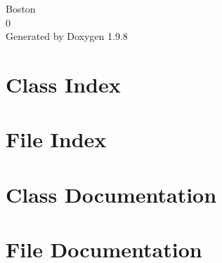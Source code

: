 \documentclass[twoside]{book}
\newcommand{\+}{\discretionary{\mbox{\scriptsize$\hookleftarrow$}}{}{}}
\newcommand{\clearemptydoublepage}{%
    \newpage{\pagestyle{empty}\cleardoublepage}%
  }
\begin{document}
  \raggedbottom
    \hypersetup{pageanchor=false,
                bookmarksnumbered=true,
                pdfencoding=unicode
               }
  \begin{titlepage}
  \vspace*{7cm}
  \begin{center}%
  {\Large Boston}\\
  [1ex]\large 0 \\
  \vspace*{1cm}
  {\large Generated by Doxygen 1.9.8}\\
  \end{center}
  \end{titlepage}
  \clearemptydoublepage
  \tableofcontents
  \clearemptydoublepage
  \hypersetup{pageanchor=true}
\chapter{Class Index}

\chapter{File Index}

\chapter{Class Documentation}



\chapter{File Documentation}













  \backmatter
  \newpage
  \clearemptydoublepage
  \printindex
\end{document}
